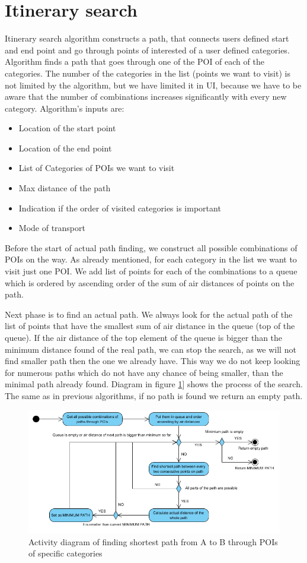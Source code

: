 \section{Itinerary search}
Itinerary search algorithm constructs a path, that connects users defined start and end point and go through points of interested of a user defined categories. Algorithm finds a path that goes through one of the POI of each of the categories. The number of the categories in the list (points we want to visit) is not limited by the algorithm, but we have limited it in UI, because we have to be aware that the number of combinations increases significantly with every new category. Algorithm's inputs are:
\begin{itemize}
\item Location of the start point
\item Location of the end point
\item List of Categories of POIs we want to visit
\item Max distance of the path
\item Indication if the order of visited categories is important
\item Mode of transport
\end{itemize}
Before the start of actual path finding, we construct all possible combinations of POIs on the way. As already mentioned, for each category in the list we want to visit just one POI. We add list of points for each of the combinations to a queue which is ordered by ascending order of the sum of air distances of points on the path.
\par
Next phase is to find an actual path. We always look for the actual path of the list of points that have the smallest sum of air distance in the queue (top of the queue). If the air distance of the top element of the queue is bigger than the minimum distance found of the real path, we can stop the search, as we will not find smaller path then the one we already have. This way we do not keep looking for numerous paths which do not have any chance of being smaller, than the minimal path already found. Diagram in figure \ref{fig:itinerary_activity}] shows the process of the search. The same as in previous algorithms, if no path is found we return an empty path.
 \begin{figure}[h]
 \centering
 \includegraphics[width=0.7\linewidth]{../pictures/shortest_path_itinerary.png}
 \caption{Activity diagram of finding shortest path from A to B through POIs of specific categories}
 \label{fig:itinerary_activity}
 \end{figure}
 
